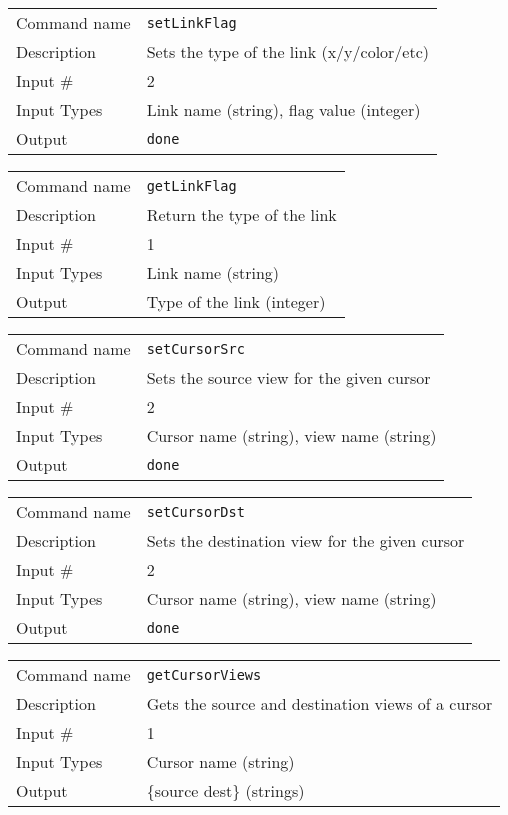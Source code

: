 \bigskip

\noindent
\begin{tabular}{l|p{5in}}
\hline
Command name & {\tt setLinkFlag} \\
Description  & Sets the type of the link (x/y/color/etc) \\
Input \#     & 2 \\
Input Types  & Link name (string), flag value (integer) \\
Output       & {\tt done} \\
\hline
\end{tabular}

\bigskip

\noindent
\begin{tabular}{l|p{5in}}
\hline
Command name & {\tt getLinkFlag} \\
Description  & Return the type of the link \\
Input \#     & 1 \\
Input Types  & Link name (string) \\
Output       & Type of the link (integer) \\
\hline
\end{tabular}

\bigskip

\noindent
\begin{tabular}{l|p{5in}}
\hline
Command name & {\tt setCursorSrc} \\
Description  & Sets the source view for the given cursor \\
Input \#     & 2 \\
Input Types  & Cursor name (string), view name (string) \\
Output       & {\tt done} \\
\hline
\end{tabular}

\bigskip

\noindent
\begin{tabular}{l|p{5in}}
\hline
Command name & {\tt setCursorDst} \\
Description  & Sets the destination view for the given cursor \\
Input \#     & 2 \\
Input Types  & Cursor name (string), view name (string) \\
Output       & {\tt done} \\
\hline
\end{tabular}

\bigskip

\noindent
\begin{tabular}{l|p{5in}}
\hline
Command name & {\tt getCursorViews} \\
Description  & Gets the source and destination views of a cursor \\
Input \#     & 1 \\
Input Types  & Cursor name (string) \\
Output       & \{source dest\} (strings) \\
\hline
\end{tabular}

